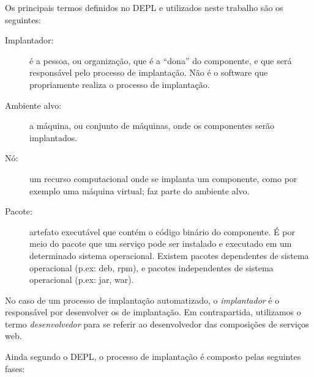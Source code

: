 
Os principais termos definidos no DEPL e utilizados neste trabalho são os seguintes:

\begin{description}
\item [Implantador:] é a pessoa, ou organização, que é a ``dona'' do componente, e que será responsável pelo processo de implantação. Não é o software que propriamente realiza o processo de implantação.
\item [Ambiente alvo:] a máquina, ou conjunto de máquinas, onde os componentes serão implantados.
\item [Nó:] um recurso computacional onde se implanta um componente, 
como por exemplo uma máquina virtual; faz parte do ambiente alvo.
\item [Pacote:] artefato executável que contém o código binário do componente.
É por meio do pacote que um serviço pode ser instalado e executado em um determinado
sistema operacional. Existem pacotes dependentes de sistema operacional (p.ex: deb, rpm),
e pacotes independentes de sistema operacional (p.ex: jar, war).
\end{description}

No caso de um processo de implantação automatizado, o \emph{implantador}
é o responsável por desenvolver os \scripts de implantação.
Em contrapartida, utilizamos o termo \emph{desenvolvedor} para se referir ao
desenvolvedor das composições de serviços web.

Ainda segundo o DEPL, o processo de implantação é composto pelas seguintes fases:

